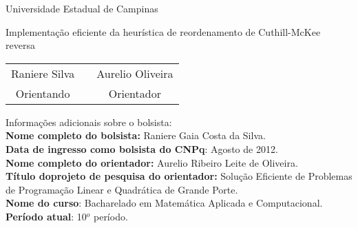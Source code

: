 \documentclass[12pt,a4paper]{article}
\begin{document}
\begin{center}
  \Huge{Universidade Estadual de Campinas}

  \vspace{3cm}

  \Large{Implementa\c{c}\~{a}o eficiente da heur\'{i}stica de reordenamento de Cuthill-McKee reversa}

  \vspace{2cm}

  \large{
    \begin{tabular}{ccc}
      Raniere Silva & \hspace{1cm} & Aurelio Oliveira \\
      Orientando & & Orientador
    \end{tabular}}
\end{center}

\vfill

\noindent Informações adicionais sobre o bolsista: \\
\textbf{Nome completo do bolsista:} Raniere Gaia Costa da Silva. \\
\textbf{Data de ingresso como bolsista do CNPq}: Agosto de 2012. \\
\textbf{Nome completo do orientador:} Aurelio Ribeiro Leite de Oliveira. \\
\textbf{Título doprojeto de pesquisa do orientador:} Solução Eficiente de
Problemas de Programação Linear e Quadrática de Grande Porte. \\
\textbf{Nome do curso}: Bacharelado em Matemática Aplicada e Computacional. \\
\textbf{Período atual}: 10$^o$ período.

\clearpage

\tableofcontents
\end{document}
